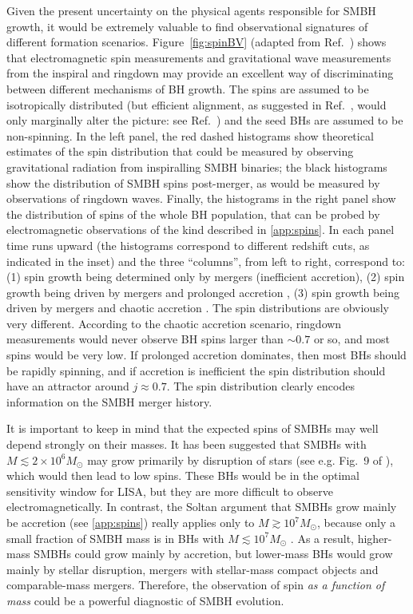 \documentclass[]{iopart}
\begin{document}
Given the present uncertainty on the physical agents responsible for SMBH
growth, it would be extremely valuable to find observational signatures of
different formation scenarios.  Figure~\ref{fig:spinBV} (adapted from
Ref.~\cite{Berti:2008af}) shows that electromagnetic spin measurements and
gravitational wave measurements from the inspiral and ringdown may provide an
excellent way of discriminating between different mechanisms of BH growth. The
spins are assumed to be isotropically distributed (but efficient alignment, as
suggested in Ref.~\cite{Bogdanovic:2007hp}, would only marginally alter the
picture: see Ref.~\cite{Berti:2008af}) and the seed BHs are assumed to be
non-spinning.  In the left panel, the red dashed histograms show theoretical
estimates of the spin distribution that could be measured by observing
gravitational radiation from inspiralling SMBH binaries; the black histograms
show the distribution of SMBH spins post-merger, as would be measured by
observations of ringdown waves. Finally, the histograms in the right panel
show the distribution of spins of the whole BH population, that can be probed
by electromagnetic observations of the kind described in \ref{app:spins}. In
each panel time runs upward (the histograms correspond to different redshift
cuts, as indicated in the inset) and the three ``columns'', from left to
right, correspond to: (1) spin growth being determined only by mergers
(inefficient accretion), (2) spin growth being driven by mergers and prolonged
accretion \cite{Volonteri:2004cf}, (3) spin growth being driven by mergers and
chaotic accretion \cite{King:2005mv,King:2006uu,King:2008au}. The spin
distributions are obviously very different. According to the chaotic accretion
scenario, ringdown measurements would never observe BH spins larger than $\sim
0.7$ or so, and most spins would be very low. If prolonged accretion
dominates, then most BHs should be rapidly spinning, and if accretion is
inefficient the spin distribution should have an attractor around $j\approx
0.7$. The spin distribution clearly encodes information on the SMBH merger
history.

It is important to keep in mind that the expected spins of SMBHs may well
depend strongly on their masses. It has been suggested that SMBHs with
$M\lesssim 2\times 10^6 M_\odot$ may grow primarily by disruption of stars
(see e.g. Fig.~9 of \cite{Wang:2003ny}), which would then lead to low
spins. These BHs would be in the optimal sensitivity window for LISA, but they
are more difficult to observe electromagnetically.  In contrast, the Soltan
\cite{Soltan:1982vf} argument that SMBHs grow mainly be accretion (see
\ref{app:spins}) really applies only to $M\gtrsim 10^7 M_\odot$, because only
a small fraction of SMBH mass is in BHs with $M\lesssim 10^7 M_\odot$ .  As a
result, higher-mass SMBHs could grow mainly by accretion, but lower-mass BHs
would grow mainly by stellar disruption, mergers with stellar-mass compact
objects and comparable-mass mergers.  Therefore, the observation of spin {\em
  as a function of mass} could be a powerful diagnostic of SMBH evolution.
\end{document}
